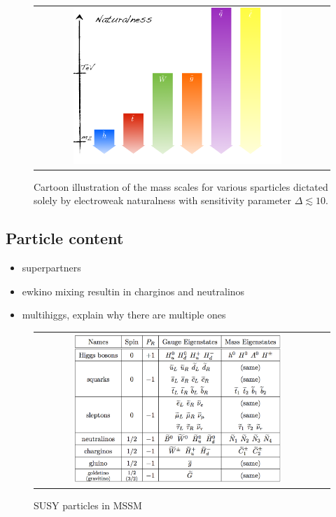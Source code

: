 \begin{figure}[tbh!]
	\centering
	\begin{tabular}{cc}
		\includegraphics[width=0.75\textwidth]{theory/pics/SUSY_naturalness.png}
	\end{tabular}
	\caption{Cartoon illustration of the mass scales for various sparticles dictated solely by electroweak naturalness with sensitivity parameter $\Delta \lesssim 10$.}
	\label{fig:SUSY_naturalness}
\end{figure}

\subsection{Particle content}

\begin{itemize}
	\item superpartners
	\item ewkino mixing resultin in charginos and neutralinos
	\item multihiggs, explain why there are multiple ones
	
\end{itemize}


\begin{figure}[tbh!]
	\centering
	\begin{tabular}{cc}
		\includegraphics[width=0.75\textwidth]{theory/pics/SUSY_particles_table.png}
	\end{tabular}
	\caption{SUSY particles in MSSM~\protect\cite{Martin:1997ns}}
	\label{fig:SUSY_particles_table}
\end{figure}

